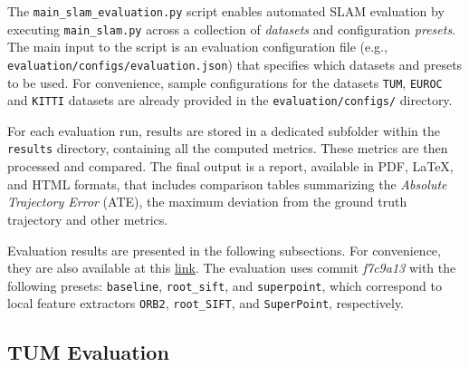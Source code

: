 \documentclass{article}
\begin{document}
The \texttt{main\_slam\_evaluation.py} script enables automated SLAM
evaluation by executing \texttt{main\_slam.py} across a collection of
\textit{datasets} and configuration \textit{presets}. The main input to the script is an evaluation configuration file (e.g., \texttt{evaluation/configs/evaluation.json}) that specifies which datasets and presets to be used. For convenience, sample configurations for the datasets \texttt{TUM}, \texttt{EUROC} and \texttt{KITTI} datasets are already provided in the \texttt{evaluation/configs/} directory.

For each evaluation run, results are
stored in a dedicated subfolder within the \texttt{results} directory,
containing all the computed metrics. These metrics are then processed
and compared. The final output is a report, available in PDF,
LaTeX, and HTML formats, that includes comparison tables summarizing the
\emph{Absolute Trajectory Error} (ATE), the maximum deviation from the
ground truth trajectory and other metrics.

Evaluation results are presented in the following subsections. For convenience, they are also available at this \href{https://github.com/luigifreda/pyslam/blob/master/docs/evaluations/evaluations.md}{link}. The evaluation uses commit \textit{f7c9a13} with the following presets: \texttt{baseline}, \texttt{root\_sift}, and \texttt{superpoint}, which correspond to local feature extractors \texttt{ORB2}, \texttt{root\_SIFT}, and \texttt{SuperPoint}, respectively. 


\hypertarget{tum-evaluation}{%
\subsection{TUM Evaluation}\label{tum-evaluation}}
\end{document}
